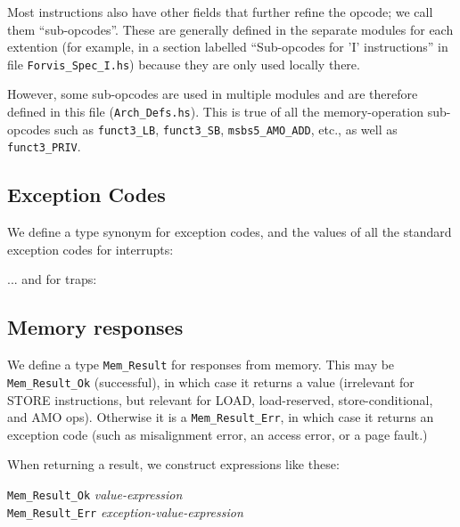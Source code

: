 \documentclass[11pt]{article}
\newcommand{\hm}{\hspace*{1em}}
\newcommand{\hmmm}{\hspace*{3em}}
\begin{document}
Most instructions also have other fields that further refine the
opcode; we call them ``sub-opcodes''.  These are generally defined in
the separate modules for each extention (for example, in a section
labelled ``Sub-opcodes for 'I' instructions'' in file
\verb|Forvis_Spec_I.hs|) because they are only used locally there.

However, some sub-opcodes are used in multiple modules and are
therefore defined in this file (\verb|Arch_Defs.hs|).  This is true of
all the memory-operation sub-opcodes such as \verb|funct3_LB|,
\verb|funct3_SB|, \verb|msbs5_AMO_ADD|, etc., as well as
\verb|funct3_PRIV|.


\subsection{Exception Codes}

We define a type synonym for exception codes, and the values of all
the standard exception codes for interrupts:



... and for traps:




\subsection{Memory responses}

\label{sec_mem_responses}

We define a type {\tt Mem\_Result} for responses from memory.  This
may be {\tt Mem\_Result\_Ok} (successful), in which case it returns a
value (irrelevant for STORE instructions, but relevant for LOAD,
load-reserved, store-conditional, and AMO ops).  Otherwise it is a
{\tt Mem\_Result\_Err}, in which case it returns an exception code
(such as misalignment error, an access error, or a page fault.)



When returning a result, we construct expressions like these:
\begin{tabbing}
\hmmm \= {\tt Mem\_Result\_Ok} \hm \= \emph{value-expression} \\
      \> {\tt Mem\_Result\_Err}    \> \emph{exception-value-expression}
\end{tabbing}
\end{document}
